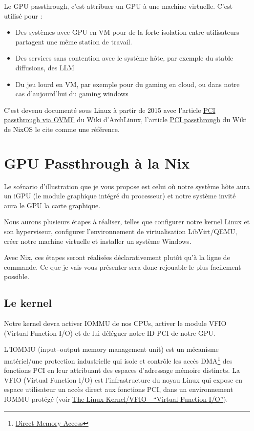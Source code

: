 \documentclass[a4paper,11pt]{article}
\begin{document}
\begin{blogmain}
Le GPU passthrough, c'est attribuer un GPU à une machine virtuelle.
C'est utilisé pour :
\begin{itemize}
  \item Des systèmes avec GPU en VM pour de la forte isolation entre utilisateurs partagent une même station de travail.
  \item Des services sans contention avec le système hôte, par exemple du stable diffusions, des LLM
  \item Du jeu lourd en VM, par exemple pour du gaming en cloud, ou dans notre cas d'aujourd'hui du gaming windows
\end{itemize}

C'est devenu documenté sous Linux à partir de 2015 avec l'article \href{https://wiki.archlinux.org/title/PCI_passthrough_via_OVMF}{PCI passthrough via OVMF} du Wiki d'ArchLinux, l'article \href{https://wiki.nixos.org/wiki/PCI_passthrough}{PCI passthrough} du Wiki de NixOS le cite comme une référence.

\section{GPU Passthrough à la Nix}
Le scénario d'illustration que je vous propose est celui où notre système hôte aura un iGPU (le module graphique intégré du processeur) et notre système invité aura le GPU la carte graphique.

Nous aurons plusieurs étapes à réaliser, telles que configurer notre kernel Linux et son hyperviseur, configurer l'environnement de virtualisation LibVirt/QEMU, créer notre machine virtuelle et installer un système Windows.

Avec Nix, ces étapes seront réalisées déclarativement plutôt qu'à la ligne de commande. Ce que je vais vous présenter sera donc rejouable le plus facilement possible.

\newpage
\subsection{Le kernel}
Notre kernel devra activer IOMMU de nos CPUs, activer le module VFIO (Virtual Function I/O) et de lui déléguer notre ID PCI de notre GPU.

L'IOMMU (input–output memory management unit) est un mécanisme matériel/une protection industrielle qui isole et contrôle les accès DMA\footnote{\href{https://fr.wikipedia.org/wiki/Acc\%C3\%A8s_direct_\%C3\%A0_la_m\%C3\%A9moire}{Direct Memory Access}} des fonctions PCI en leur attribuant des espaces d’adressage mémoire distincts.
La VFIO (Virtual Function I/O) est l'infrastructure du noyau Linux qui expose en espace utilisateur un accès direct aux fonctions PCI, dans un environnement IOMMU protégé (voir \href{https://docs.kernel.org/driver-api/vfio.html}{The Linux Kernel/VFIO - “Virtual Function I/O”}).


\end{blogmain}
\end{document}
